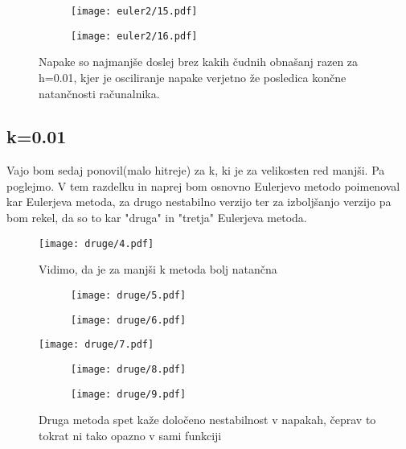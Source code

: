 \documentclass{article}
\begin{document}
\begin{figure}[H]
\begin{subfigure}{.5\textwidth}
\texttt{[image: euler2/15.pdf]}
\end{subfigure}
\begin{subfigure}{.5\textwidth}
\texttt{[image: euler2/16.pdf]}
\end{subfigure}
\caption*{Napake so najmanjše doslej brez kakih čudnih obnašanj razen za h=0.01, kjer je osciliranje napake verjetno že posledica končne natančnosti računalnika.}
\end{figure}
\newpage
\subsection{k=0.01}
Vajo bom sedaj ponovil(malo hitreje) za k, ki je za velikosten red manjši. Pa poglejmo. V tem razdelku in naprej bom osnovno Eulerjevo metodo poimenoval
kar Eulerjeva metoda, za drugo nestabilno verzijo ter za izboljšanjo verzijo pa bom rekel, da so to kar "druga" in "tretja" Eulerjeva metoda.

\begin{figure}[H]
\texttt{[image: druge/4.pdf]}
\caption*{Vidimo, da je za manjši k metoda bolj natančna}
\end{figure}
\begin{figure}[H]
\begin{subfigure}{.5\textwidth}
\texttt{[image: druge/5.pdf]}
\end{subfigure}
\begin{subfigure}{.5\textwidth}
\texttt{[image: druge/6.pdf]}
\end{subfigure}
\end{figure}

\begin{figure}[H]
\texttt{[image: druge/7.pdf]}
\end{figure}
\begin{figure}[H]
\begin{subfigure}{.5\textwidth}
\texttt{[image: druge/8.pdf]}
\end{subfigure}
\begin{subfigure}{.5\textwidth}
\texttt{[image: druge/9.pdf]}
\end{subfigure}
\caption*{Druga metoda spet kaže določeno nestabilnost v napakah, čeprav to tokrat ni tako opazno v sami funkciji}
\end{figure}
\end{document}
